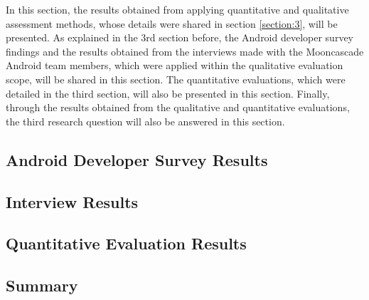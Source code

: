 In this section, the results obtained from applying quantitative and qualitative assessment methods, whose details were shared in section \ref{section:3}, will be presented. As explained in the 3rd section before, the Android developer survey findings and the results obtained from the interviews made with the Mooncascade Android team members, which were applied within the qualitative evaluation scope, will be shared in this section. The quantitative evaluations, which were detailed in the third section, will also be presented in this section. Finally, through the results obtained from the qualitative and quantitative evaluations, the third research question will also be answered in this section.

\subsection{Android Developer Survey Results}


\subsection{Interview Results}


\subsection{Quantitative Evaluation Results}


\subsection{Summary}
